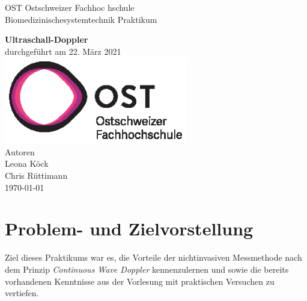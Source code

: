 \documentclass[11pt]{scrartcl}
\begin{document}
    \begin{titlepage}
        \begin{center}
        {\LARGE OST Ostschweizer Fachhoc
        hschule}
            \\[1.5cm]
            \linespread{1.2}\large { Biomedizinischesystemtechnik Praktikum }

            \huge{\bfseries Ultraschall-Doppler}
            \\%
            \large{durchgef{\"u}hrt am 22. März 2021}
            \\[1.5cm]
           \includegraphics[width=8cm]{../images/ost_logo.eps}
           \\[1cm]
            {\small{Autoren}}\\
            {\Large{Leona K{\"o}ck}}\\
            {\Large{Chris R{\"u}ttimann}}
            \\[1cm]

            \vspace*{\fill}
            \large{\today}
        \end{center}

    \end{titlepage}

    \addtocounter{section}{0}

    \tableofcontents
    \pagebreak



    \section{Problem- und Zielvorstellung}
    Ziel dieses Praktikums war es, die Vorteile der nichtinvasiven Messmethode nach dem Prinzip \emph{Continuous Wave Doppler}
    kennenzulernen und sowie die bereits vorhandenen Kenntnisse aus der Vorlesung mit praktischen Versuchen zu vertiefen. 
\end{document}
